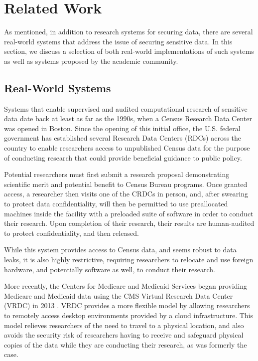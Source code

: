 \documentclass{acm_proc_article-sp}
\begin{document}
\section{Related Work}

As mentioned, in addition to research systems for securing data, there are
several real-world systems that address the issue of securing sensitive data.
In this section, we discuss a selection of both real-world implementations of
such systems as well as systems proposed by the academic community.

\subsection{Real-World Systems}

Systems that enable supervised and audited computational research of sensitive
data date back at least as far as the 1990s, when a Census Research Data Center
was opened in Boston.  Since the opening of this initial office, the U.S.
federal government has established several Research Data Centers (RDCs)
\cite{census-rdc} across the country to enable researchers access to
unpublished Census data for the purpose of conducting research that could
provide beneficial guidance to public policy.

Potential researchers must first submit a research proposal demonstrating
scientific merit and potential benefit to Census Bureau programs.  Once granted
access, a researcher then visits one of the CRDCs in person, and, after swearing
to protect data confidentiality, will then be permitted to use preallocated
machines inside the facility with a preloaded suite of software in order to
conduct their research.  Upon completion of their research, their results are
human-audited to protect confidentiality, and then released.

While this system provides access to Census data, and seems robust to data
leaks, it is also highly restrictive, requiring researchers to relocate and use
foreign hardware, and potentially software as well, to conduct their research.

More recently, the Centers for Medicare and Medicaid Services began providing
Medicare and Medicaid data using the CMS Virtual Research Data Center (VRDC) in
2013 \cite{vrdc}.  VRDC provides a more flexible model by allowing researchers
to remotely access desktop environments provided by a cloud infrastructure.
This model relieves researchers of the need to travel to a physical location,
and also avoids the security risk of researchers having to receive and
safeguard physical copies of the data while they are conducting their research,
as was formerly the case.
\end{document}
